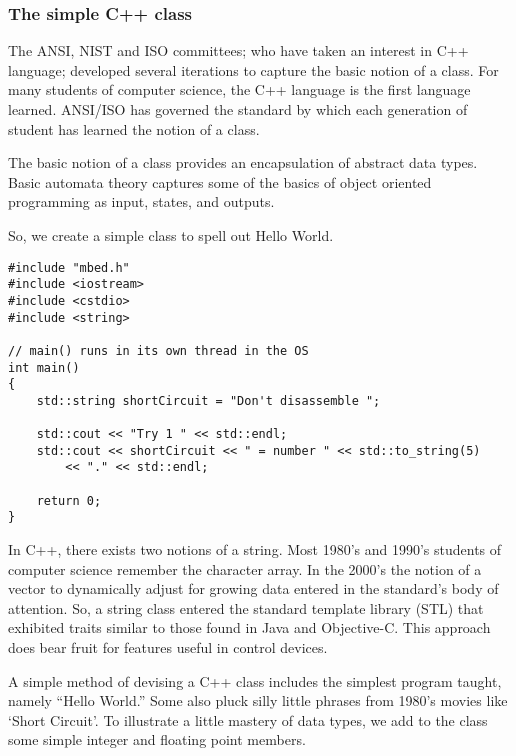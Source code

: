 \documentclass{article}
\begin{document}

\newpage
\subsubsection{The simple C++ class} %
\label{ssub:the_simple_c_class}

The ANSI, NIST and ISO committees; who have taken an interest in C++ language; developed several iterations to capture the basic notion of a class.  For many students of computer science, the C++ language is the first language learned.  ANSI/ISO has governed the standard by which each generation of student has learned the notion of a class.

The basic notion of a class provides an encapsulation of abstract data types.   Basic automata theory captures some of the basics of object oriented programming as input, states, and outputs. 

So, we create a simple class to spell out Hello World. %


\begin{lstlisting}
#include "mbed.h"
#include <iostream>
#include <cstdio>
#include <string>

// main() runs in its own thread in the OS
int main()
{
    std::string shortCircuit = "Don't disassemble ";
   
    std::cout << "Try 1 " << std::endl;
    std::cout << shortCircuit << " = number " << std::to_string(5) 
		<< "." << std::endl;

	return 0;
}
\end{lstlisting}


In C++, there exists two notions of a string.  Most 1980's and 1990's students of computer science remember the character array.  In the 2000's the notion of a vector to dynamically adjust for growing data entered in the standard's body of attention.  So, a string class entered the standard template library (STL) that exhibited traits similar to those found in Java and Objective-C.  This approach does bear fruit for features useful in control devices.

A simple method of devising a C++ class includes the simplest program taught, namely ``Hello World.''  Some also pluck silly little phrases from 1980's movies like `Short Circuit'.  To illustrate a little mastery of data types, we add to the class some simple integer and floating point members.  
\end{document}

